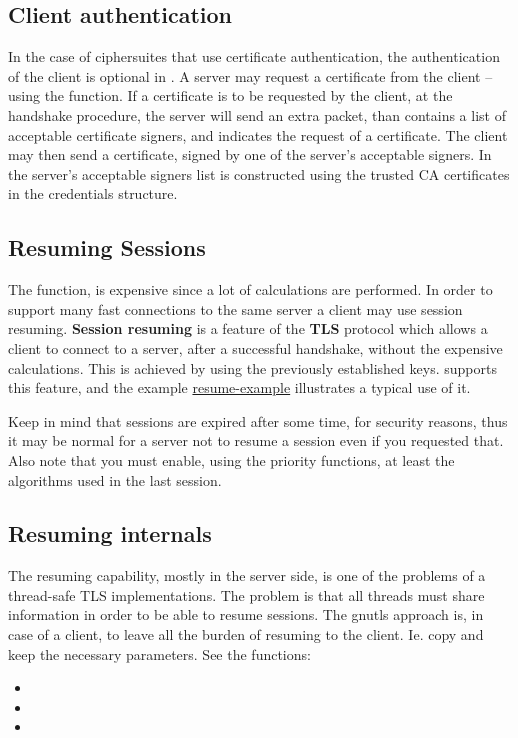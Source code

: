 \subsection{Client authentication}
In the case of ciphersuites that use certificate authentication, the
authentication of the client is
optional in \tls{}. A server may request a certificate from the client -- using the
function. If a certificate is to be requested by the client, at the handshake
procedure, the server will send an extra packet,
than contains a list of acceptable certificate signers, and indicates the
request of a certificate. The client may then send a certificate, signed
by one of the server's acceptable signers. In \gnutls{} the server's acceptable
signers list is constructed using the trusted CA certificates in the
credentials structure.

\subsection{Resuming Sessions}
\label{resume}
\par
The 
 function, is expensive since a lot of calculations are performed. In order to support many fast connections to
the same server a client may use session resuming. {\bf Session resuming} is a
feature of the {\bf TLS} protocol which allows a client to connect to a server,
after a successful handshake, without the expensive calculations. This is
achieved by using the previously
established keys. \gnutls{} supports this feature, and the
example \hyperref{resume client}{resume client (see section }{)}{resume-example} illustrates a typical use of it.
\par
Keep in mind that sessions are expired after some time, for security reasons, thus
it may be normal for a server not to resume a session even if you requested that.
Also note that you must enable, using the priority functions, at least the
algorithms used in the last session.

\subsection{Resuming internals}
The resuming capability, mostly in the server side, is one of the problems of a thread-safe TLS
implementations. The problem is that all threads must share information in
order to be able to resume sessions. The gnutls approach is, in case of a
client, to leave all the burden of resuming to the client. Ie. copy and keep the
necessary parameters. See the functions:
\begin{itemize}
\item {}
\item {}
\item {}
\end{itemize}

